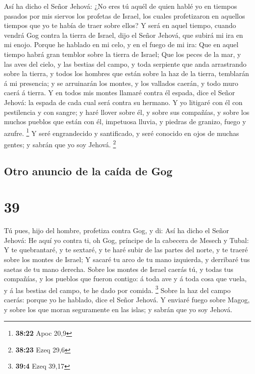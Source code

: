  Así ha dicho el Señor Jehová: ¿No eres tú aquél de quien
hablé yo en tiempos pasados por mis siervos los profetas de Israel, los
cuales profetizaron en aquellos tiempos que yo te había de traer sobre
ellos?  Y será en aquel tiempo, cuando vendrá Gog contra la
tierra de Israel, dijo el Señor Jehová, que subirá mi ira en mi enojo.
 Porque he hablado en mi celo, y en el fuego de mi ira: Que
en aquel tiempo habrá gran temblor sobre la tierra de Israel;
 Que los peces de la mar, y las aves del cielo, y las
bestias del campo, y toda serpiente que anda arrastrando sobre la
tierra, y todos los hombres que están sobre la haz de la tierra,
temblarán á mi presencia; y se arruinarán los montes, y los vallados
caerán, y todo muro caerá á tierra.  Y en todos mis montes
llamaré contra él espada, dice el Señor Jehová: la espada de cada cual
será contra su hermano.  Y yo litigaré con él con
pestilencia y con sangre; y haré llover sobre él, y sobre sus compañías,
y sobre los muchos pueblos que están con él, impetuosa lluvia, y piedras
de granizo, fuego y azufre. \footnote{\textbf{38:22} Apoc 20,9}
 Y seré engrandecido y santificado, y seré conocido en ojos
de muchas gentes; y sabrán que yo soy Jehová. \footnote{\textbf{38:23}
  Ezeq 29,6}

\hypertarget{otro-anuncio-de-la-cauxedda-de-gog}{%
\subsection{Otro anuncio de la caída de
Gog}\label{otro-anuncio-de-la-cauxedda-de-gog}}

\hypertarget{section-38}{%
\section{39}\label{section-38}}

 Tú pues, hijo del hombre, profetiza contra Gog, y di: Así
ha dicho el Señor Jehová: He aquí yo contra ti, oh Gog, príncipe de la
cabecera de Mesech y Tubal:  Y te quebrantaré, y te sextaré,
y te haré subir de las partes del norte, y te traeré sobre los montes de
Israel;  Y sacaré tu arco de tu mano izquierda, y derribaré
tus saetas de tu mano derecha.  Sobre los montes de Israel
caerás tú, y todas tus compañías, y los pueblos que fueron contigo: á
toda ave y á toda cosa que vuela, y á las bestias del campo, te he dado
por comida. \footnote{\textbf{39:4} Ezeq 39,17}  Sobre la
haz del campo caerás: porque yo he hablado, dice el Señor Jehová.
 Y enviaré fuego sobre Magog, y sobre los que moran
seguramente en las islas; y sabrán que yo soy Jehová.

